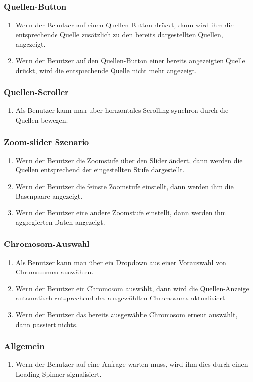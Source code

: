 \subsubsection{Quellen-Button}
\begin{enumerate}
	\item Wenn der Benutzer auf einen Quellen-Button drückt, dann wird ihm die entsprechende Quelle zusätzlich zu den bereits dargestellten Quellen, angezeigt.
	\item Wenn der Benutzer auf den Quellen-Button einer bereits angezeigten Quelle drückt, wird die entsprechende Quelle nicht mehr angezeigt.
\end{enumerate}

\subsubsection{Quellen-Scroller}
\begin{enumerate}
	\item Als Benutzer kann man über horizontales Scrolling synchron durch die Quellen bewegen.
\end{enumerate}

\subsubsection{Zoom-slider Szenario}
\begin{enumerate}
	\item Wenn der Benutzer die Zoomstufe über den Slider ändert, dann werden die Quellen entsprechend der eingestellten Stufe dargestellt.
	\item Wenn der Benutzer die feinste Zoomstufe einstellt, dann werden ihm die Basenpaare angezeigt.
	\item Wenn der Benutzer eine andere Zoomstufe einstellt, dann werden ihm aggregierten Daten angezeigt.
\end{enumerate}

\subsubsection{Chromosom-Auswahl}
\begin{enumerate}
	\item Als Benutzer kann man über ein Dropdown aus einer Vorauswahl von Chromosomen auswählen.
	\item Wenn der Benutzer ein Chromosom auswählt, dann wird die Quellen-Anzeige automatisch entsprechend des ausgewählten Chromosoms aktualisiert.
	\item Wenn der Benutzer das bereits ausgewählte Chromosom erneut auswählt, dann passiert nichts.
\end{enumerate}

\subsubsection{Allgemein}
\begin{enumerate}
	\item Wenn der Benutzer auf eine Anfrage warten muss, wird ihm dies durch einen Loading-Spinner signalisiert.	
\end{enumerate}
\newpage